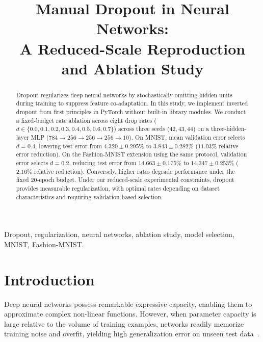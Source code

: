\documentclass[conference]{IEEEtran}
\begin{document}
\title{Manual Dropout in Neural Networks:\\A Reduced-Scale Reproduction and Ablation Study}

\author{
}

\maketitle

\begin{abstract}
Dropout regularizes deep neural networks by stochastically omitting hidden units during training to suppress feature co-adaptation. In this study, we implement inverted dropout from first principles in PyTorch without built-in library modules. We conduct a fixed-budget rate ablation across eight drop rates ($d \in \{0.0, 0.1, 0.2, 0.3, 0.4, 0.5, 0.6, 0.7\}$) across three seeds ($42, 43, 44$) on a three-hidden-layer MLP ($784 \to 256 \to 256 \to 256 \to 10$). On MNIST, mean validation error selects $d=0.4$, lowering test error from $4.320 \pm 0.295\%$ to $3.843 \pm 0.282\%$ ($11.03\%$ relative error reduction). On the Fashion-MNIST extension using the same protocol, validation error selects $d=0.2$, reducing test error from $14.663 \pm 0.175\%$ to $14.347 \pm 0.253\%$ ($2.16\%$ relative reduction). Conversely, higher rates degrade performance under the fixed 20-epoch budget. Under our reduced-scale experimental constraints, dropout provides measurable regularization, with optimal rates depending on dataset characteristics and requiring validation-based selection.
\end{abstract}

\begin{IEEEkeywords}
Dropout, regularization, neural networks, ablation study, model selection, MNIST, Fashion-MNIST.
\end{IEEEkeywords}

\section{Introduction}
Deep neural networks possess remarkable expressive capacity, enabling them to approximate complex non-linear functions. However, when parameter capacity is large relative to the volume of training examples, networks readily memorize training noise and overfit, yielding high generalization error on unseen test data~\cite{srivastava2014dropout}.
\end{document}
